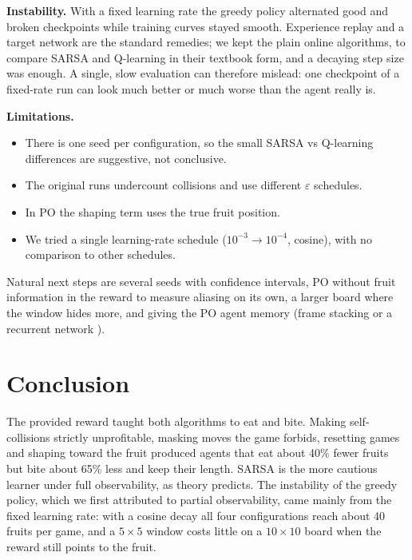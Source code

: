 \documentclass{article}
\begin{document}
\textbf{Instability.} With a fixed learning rate the greedy policy alternated good and broken checkpoints while training curves stayed smooth. Experience replay and a target network \cite{mnih2015} are the standard remedies; we kept the plain online algorithms, to compare SARSA and Q-learning in their textbook form, and a decaying step size was enough. A single, slow evaluation can therefore mislead: one checkpoint of a fixed-rate run can look much better or much worse than the agent really is.

\textbf{Limitations.}
\begin{itemize}
\item There is one seed per configuration, so the small SARSA vs Q-learning differences are suggestive, not conclusive.
\item The original runs undercount collisions and use different $\varepsilon$ schedules.
\item In PO the shaping term uses the true fruit position.
\item We tried a single learning-rate schedule ($10^{-3}\to10^{-4}$, cosine), with no comparison to other schedules.
\end{itemize}
Natural next steps are several seeds with confidence intervals, PO without fruit information in the reward to measure aliasing on its own, a larger board where the window hides more, and giving the PO agent memory (frame stacking or a recurrent network \cite{hausknecht2015}).

\section{Conclusion}
\label{sec:conclusion}

The provided reward taught both algorithms to eat and bite. Making self-collisions strictly unprofitable, masking moves the game forbids, resetting games and shaping toward the fruit produced agents that eat about 40\% fewer fruits but bite about 65\% less and keep their length.
SARSA is the more cautious learner under full observability, as theory predicts.
The instability of the greedy policy, which we first attributed to partial observability, came mainly from the fixed learning rate: with a cosine decay all four configurations reach about 40 fruits per game, and a $5\times5$ window costs little on a $10\times10$ board when the reward still points to the fruit.



\end{document}
